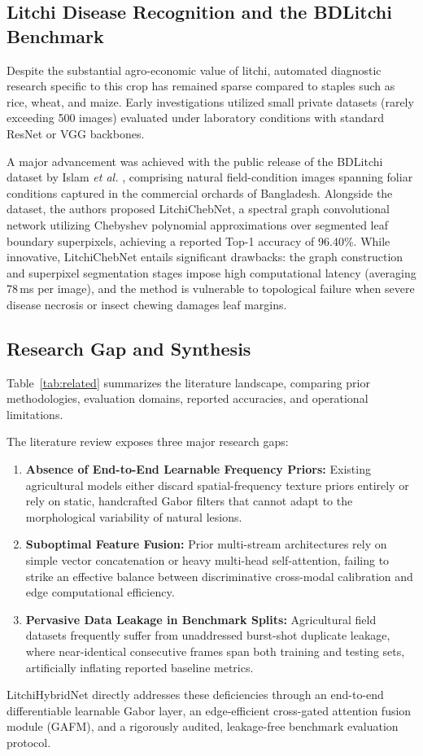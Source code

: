 \subsection{Litchi Disease Recognition and the BDLitchi Benchmark}
Despite the substantial agro-economic value of litchi, automated diagnostic research specific to this crop has remained sparse compared to staples such as rice, wheat, and maize. Early investigations utilized small private datasets (rarely exceeding 500 images) evaluated under laboratory conditions with standard ResNet or VGG backbones. 

A major advancement was achieved with the public release of the BDLitchi dataset by Islam \textit{et al.} \cite{litchi_dataset_2022}, comprising \totalImages{} natural field-condition images spanning \numClasses{} foliar conditions captured in the commercial orchards of Bangladesh. Alongside the dataset, the authors proposed LitchiChebNet, a spectral graph convolutional network utilizing Chebyshev polynomial approximations over segmented leaf boundary superpixels, achieving a reported Top-1 accuracy of 96.40\%. While innovative, LitchiChebNet entails significant drawbacks: the graph construction and superpixel segmentation stages impose high computational latency (averaging 78\,ms per image), and the method is vulnerable to topological failure when severe disease necrosis or insect chewing damages leaf margins.

\subsection{Research Gap and Synthesis}
Table~\ref{tab:related} summarizes the literature landscape, comparing prior methodologies, evaluation domains, reported accuracies, and operational limitations. 



The literature review exposes three major research gaps:
\begin{enumerate}
    \item \textbf{Absence of End-to-End Learnable Frequency Priors:} Existing agricultural models either discard spatial-frequency texture priors entirely or rely on static, handcrafted Gabor filters that cannot adapt to the morphological variability of natural lesions.
    \item \textbf{Suboptimal Feature Fusion:} Prior multi-stream architectures rely on simple vector concatenation or heavy multi-head self-attention, failing to strike an effective balance between discriminative cross-modal calibration and edge computational efficiency.
    \item \textbf{Pervasive Data Leakage in Benchmark Splits:} Agricultural field datasets frequently suffer from unaddressed burst-shot duplicate leakage, where near-identical consecutive frames span both training and testing sets, artificially inflating reported baseline metrics.
\end{enumerate}

LitchiHybridNet directly addresses these deficiencies through an end-to-end differentiable learnable Gabor layer, an edge-efficient cross-gated attention fusion module (GAFM), and a rigorously audited, leakage-free benchmark evaluation protocol.
